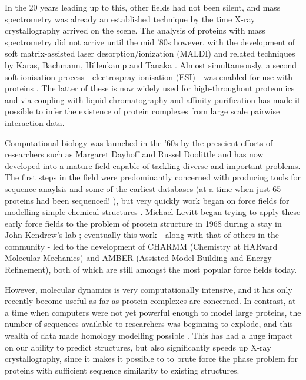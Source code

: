 \documentclass[a4paper,11pt,twoside,openright]{scrbook}
\begin{document}
In the 20 years leading up to this, other fields had not been silent, and mass spectrometry was already an established technique by the time X-ray crystallography arrived on the scene. The analysis of proteins with mass spectrometry did not arrive until the mid '80s however, with the development of soft matrix-assisted laser desorption/ionization (MALDI) and related techniques by Karas, Bachmann, Hillenkamp and Tanaka \cite{Karas1985,Tanaka1988}. Almost simultaneously, a second soft ionisation process - electrospray ionisation (ESI) - was enabled for use with proteins \cite{Fenn1989}. The latter of these is now widely used for high-throughout proteomics and via coupling with liquid chromatography and affinity purification has made it possible to infer the existence of protein complexes from large scale pairwise interaction data.

Computational biology was launched in the '60s by the prescient efforts of researchers such as Margaret Dayhoff and Russel Doolittle and has now developed into a mature field capable of tackling diverse and important problems. The first steps in the field were predominantly concerned with producing tools for sequence anaylsis and some of the earliest databases (at a time when just 65 proteins had been sequenced! \cite{Dayhoff1965}), but very quickly work began on force fields for modelling simple chemical structures \cite{Bixon1967}. Michael Levitt began trying to apply these early force fields to the problem of protein structure in 1968 during a stay in John Kendrew's lab \cite{Levitt2001}; eventually this work - along with that of others in the community - led to the development of CHARMM \cite{Brooks2009} (Chemistry at HARvard Molecular Mechanics) and AMBER \cite{Salomon-Ferrer2013,Amber2017} (Assisted Model Building and Energy Refinement), both of which are still amongst the most popular force fields today.

However, molecular dynamics is very computationally intensive, and it has only recently become useful as far as protein complexes are concerned. In contrast, at a time when computers were not yet powerful enough to model large proteins, the number of sequences available to researchers was beginning to explode, and this wealth of data made homology modelling possible \cite{Rost1996,Xu1998}. This has had a huge impact on our ability to predict structures, but also significantly speeds up X-ray crystallography, since it makes it possible to to brute force the phase problem for proteins with sufficient sequence similarity to existing structures.
\end{document}
